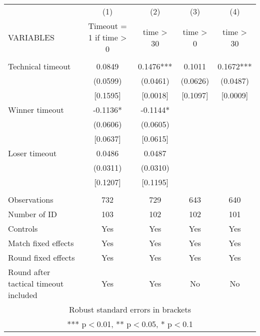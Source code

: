 \documentclass[]{article}
\begin{document}
\begin{tabular}{lcccc} \hline
 & (1) & (2) & (3) & (4) \\
VARIABLES & Timeout = 1 if time > 0 & time > 30 & time > 0 & time > 30 \\ \hline
 &  &  &  &  \\
Technical timeout & 0.0849 & 0.1476*** & 0.1011 & 0.1672*** \\
 & (0.0599) & (0.0461) & (0.0626) & (0.0487) \\
 & [0.1595] & [0.0018] & [0.1097] & [0.0009] \\
Winner timeout & -0.1136* & -0.1144* &  &  \\
 & (0.0606) & (0.0605) &  &  \\
 & [0.0637] & [0.0615] &  &  \\
Loser timeout & 0.0486 & 0.0487 &  &  \\
 & (0.0311) & (0.0310) &  &  \\
 & [0.1207] & [0.1195] &  &  \\
 &  &  &  &  \\
Observations & 732 & 729 & 643 & 640 \\
Number of ID & 103 & 102 & 102 & 101 \\
Controls & Yes & Yes & Yes & Yes \\
Match fixed effects & Yes & Yes & Yes & Yes \\
Round fixed effects & Yes & Yes & Yes & Yes \\
 Round after tactical timeout included & Yes & Yes & No & No \\ \hline
\multicolumn{5}{c}{ Robust standard errors in brackets} \\
\multicolumn{5}{c}{ *** p$<$0.01, ** p$<$0.05, * p$<$0.1} \\
\end{tabular}
\end{document}

